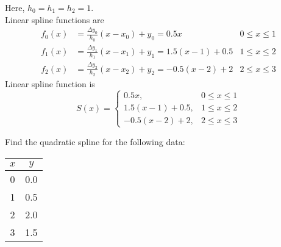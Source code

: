 \documentclass[12pt,class=book,crop=false]{standalone}
\begin{document}
\begin{soln}
	Here,  $ h_0=h_1=h_2=1 $.\\
	Linear spline functions are
	\begin{align*}
		f_0 (x)&=\frac{\Delta y_0}{h_0} (x-x_0)+y_0=0.5x			& 0 \leq x \leq 1\\
		f_1 (x)&=\frac{\Delta y_1}{h_1} (x-x_1)+y_1=1.5(x-1)+0.5		& 1 \leq x \leq 2\\
		f_2 (x)&=\frac{\Delta y_2}{h_2} (x-x_2)+y_2=-0.5(x-2)+2		& 2 \leq x \leq 3
	\end{align*}
	Linear spline function is
	\[
		S(x)=\begin{cases}
			0.5x, & 0 \leq x \leq 1\\
			1.5(x-1)+0.5,& 1 \leq x \leq 2\\
			-0.5(x-2)+2, & 2 \leq x \leq 3
		\end{cases}
	\]	
\end{soln}
\begin{prob}
	Find the quadratic spline for the following data:
	\begin{table}[H]
		\centering
		\begin{tabular}{cc}
			\toprule
			$ x $	&
			$ y $	\\\midrule
			0	&
			0.0	\\
			1	&
			0.5	\\
			2	&
			2.0	\\
			3&
			1.5\\\hline
		\end{tabular}
	\end{table}
\end{prob}
\end{document}
